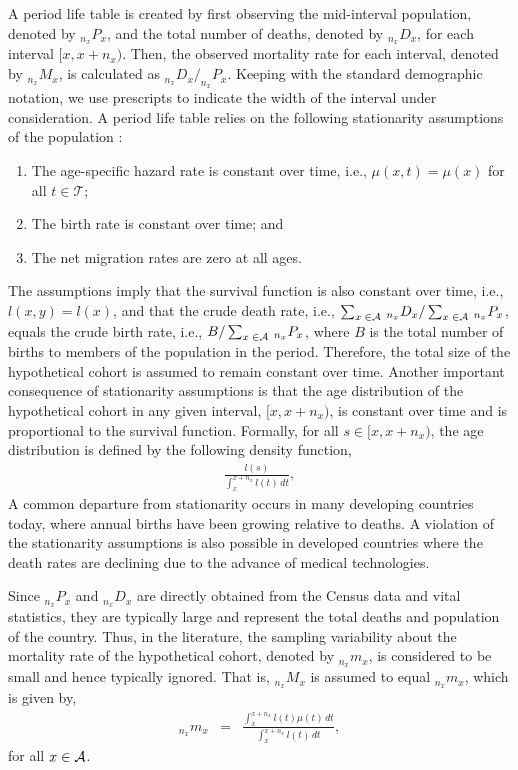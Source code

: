 \documentclass[11pt,letterpaper]{article}
\theoremstyle{plain}
\begin{document}
A period life table is created by first observing the mid-interval
population, denoted by $_{n_x}P_x$, and the total number of deaths,
denoted by $_{n_x}D_x$, for each interval $[x,x+n_x)$.  Then, the
observed mortality rate for each interval, denoted by $_{n_x}M_x$, is
calculated as $_{n_x}D_x/_{n_x}P_x$.  Keeping with the standard
demographic notation, we use prescripts to indicate the width of the
interval under consideration.  A period life table relies on the
following stationarity assumptions of the population
\cite{chiang84,PreHeuGui00}:
\begin{enumerate}
\item The age-specific hazard rate is constant over
  time, i.e., $\mu(x,t)=\mu(x)$ for all $t\in\mathcal{T}$;
\item The birth rate is constant over time; and
\item The net migration rates are zero at all ages.
\end{enumerate}

The assumptions imply that the survival function is also constant over
time, i.e., $l(x,y)=l(x)$, and that the crude death rate, i.e.,
$\sum_{x\; \in \mathcal{A}} \,_{n_x}D_x/\sum_{x\; \in \mathcal{A}}\,_{n_x}P_x$, equals
the crude birth rate, i.e., $B / \sum_{x\; \in \mathcal{A}}\,_{n_x}P_x$, where
$B$ is the total number of births to members of the population in the
period.  Therefore, the total size of the hypothetical cohort is
assumed to remain constant over time. Another important consequence of
stationarity assumptions is that the age distribution of the
hypothetical cohort in any given interval, $[x,x+n_x)$, is constant
over time and is proportional to the survival function. Formally, for
all $s \in [x, x+n_x)$, the age distribution is defined by the
following density function,
\begin{eqnarray}
   \frac{l(s)}{\int_x^{x+n_x} l(t)\, dt},  
\label{eq:age}
\end{eqnarray}
A common departure from stationarity occurs in many
developing countries today, where annual births have been growing
relative to deaths. A violation of the stationarity assumptions is
also possible in developed countries where the death rates are
declining due to the advance of medical technologies.

Since $_{n_x}P_x$ and $_{n_x}D_x$ are directly obtained from the
Census data and vital statistics, they are typically large and
represent the total deaths and population of the country.  Thus, in
the literature, the sampling variability about the mortality rate of
the hypothetical cohort, denoted by $_{n_x}m_x$, is considered to be
small and hence typically ignored. That is, $_{n_x}M_x$ is assumed to
equal $_{n_x}m_x$, which is given by,
\begin{eqnarray}
  _{n_x}m_x & = & \frac{\int_x^{x+n_x} l(t) \mu(t)\, dt}{\int_x^{x+n_x}
    l(t)\, dt}, \label{eq:nmx}
\end{eqnarray}
for all $x \in \mathcal{A}$.  
\end{document}

